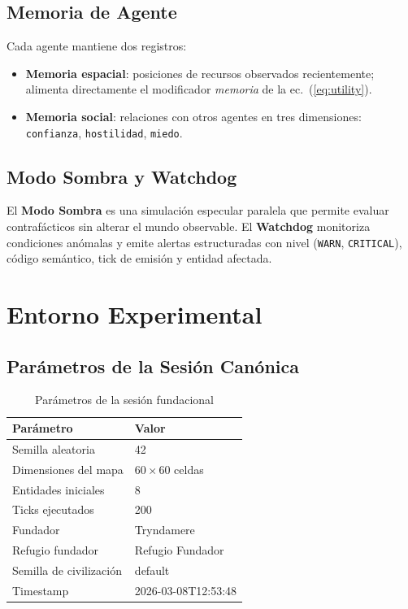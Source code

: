 \documentclass[11pt,a4paper,twocolumn]{article}
\begin{document}
\subsection{Memoria de Agente}

Cada agente mantiene dos registros:

\begin{itemize}[leftmargin=1em, itemsep=2pt, topsep=2pt]
  \item \textbf{Memoria espacial}: posiciones de recursos observados
        recientemente; alimenta directamente el modificador
        \textit{memoria} de la ec.~(\ref{eq:utility}).
  \item \textbf{Memoria social}: relaciones con otros agentes en tres
        dimensiones: \texttt{confianza}, \texttt{hostilidad},
        \texttt{miedo}.
\end{itemize}

\subsection{Modo Sombra y Watchdog}

El \textbf{Modo Sombra} es una simulaci\'on especular paralela que
permite evaluar contraf\'acticos sin alterar el mundo observable.
El \textbf{Watchdog} monitoriza condiciones an\'omalas y emite alertas
estructuradas con nivel (\texttt{WARN}, \texttt{CRITICAL}), c\'odigo
sem\'antico, tick de emisi\'on y entidad afectada.

\section{Entorno Experimental}

\subsection{Par\'ametros de la Sesi\'on Can\'onica}

\begin{table}[h]
  \centering
  \caption{Par\'ametros de la sesi\'on fundacional}
  \label{tab:params}
  \small
  \begin{tabular}{ll}
    \toprule
    \textbf{Par\'ametro} & \textbf{Valor} \\
    \midrule
    Semilla aleatoria         & 42 \\
    Dimensiones del mapa      & $60 \times 60$ celdas \\
    Entidades iniciales       & 8 \\
    Ticks ejecutados          & 200 \\
    Fundador                  & Tryndamere \\
    Refugio fundador          & Refugio Fundador \\
    Semilla de civilizaci\'on & default \\
    Timestamp                 & 2026-03-08T12:53:48 \\
    \bottomrule
  \end{tabular}
\end{table}
\end{document}
